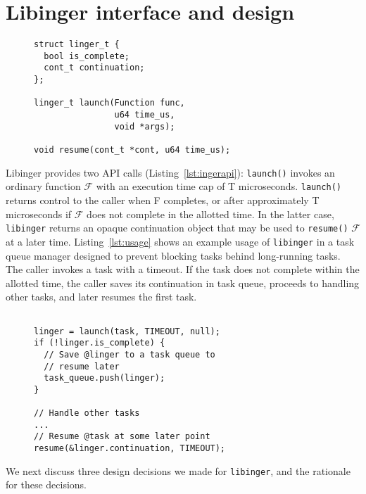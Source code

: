 \section{Libinger interface and design}

\begin{figure}
\begin{lstlisting}[label=lst:ingerapi,caption=Preemptible functions interface,captionpos=b]
struct linger_t {
  bool is_complete;
  cont_t continuation;
};

linger_t launch(Function func,
                u64 time_us,
                void *args);

void resume(cont_t *cont, u64 time_us);
\end{lstlisting}
\end{figure}

Libinger provides two API calls (Listing~\ref{lst:ingerapi}): \texttt{launch()}
invokes an ordinary function $\mathcal{F}$ with an execution time cap of T
microseconds. \texttt{launch()} returns control to the caller when F completes,
or after approximately T microseconds if $\mathcal{F}$ does not complete in the
allotted time. In the latter case, \texttt{libinger} returns an opaque
continuation object that may be used to \texttt{resume()} $\mathcal{F}$ at a
later time. Listing~\ref{lst:usage} shows an example usage of \texttt{libinger}
in a task queue manager designed to prevent blocking tasks behind long-running
tasks. The caller invokes a task with a timeout. If the task does not complete
within the allotted time, the caller saves its continuation in task queue,
proceeds to handling other tasks, and later resumes the first task. 

\begin{figure}
\begin{lstlisting}[label=lst:usage, caption=Preemptible function usage example,captionpos=b]

linger = launch(task, TIMEOUT, null);
if (!linger.is_complete) {
  // Save @linger to a task queue to
  // resume later
  task_queue.push(linger);
}

// Handle other tasks
...
// Resume @task at some later point
resume(&linger.continuation, TIMEOUT);

\end{lstlisting}
\end{figure}

We next discuss three design decisions we made for \texttt{libinger}, and the
rationale for these decisions.

